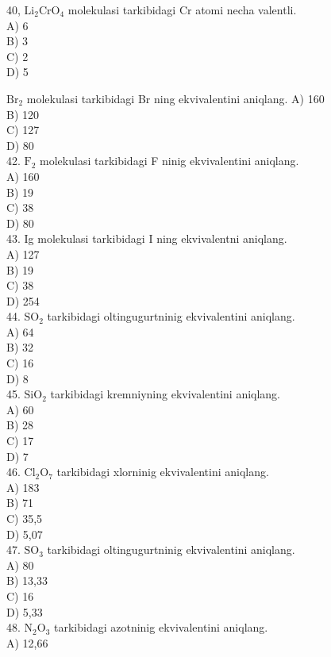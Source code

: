 40, $\mathrm{Li}_{2} \mathrm{CrO}_{4}$ molekulasi tarkibidagi Cr atomi necha valentli.\\
A) 6\\
B) 3\\
C) 2\\
D) 5
  \item $\mathrm{Br}_{2}$ molekulasi tarkibidagi Br ning ekvivalentini aniqlang.
A) 160\\
B) 120\\
C) 127\\
D) 80\\
42. $\mathrm{F}_{2}$ molekulasi tarkibidagi F ninig ekvivalentini aniqlang.\\
A) 160\\
B) 19\\
C) 38\\
D) 80\\
43. Ig molekulasi tarkibidagi I ning ekvivalentni aniqlang.\\
A) 127\\
B) 19\\
C) 38\\
D) 254\\
44. $\mathrm{SO}_{2}$ tarkibidagi oltingugurtninig ekvivalentini aniqlang.\\
A) 64\\
B) 32\\
C) 16\\
D) 8\\
45. $\mathrm{SiO}_{2}$ tarkibidagi kremniyning ekvivalentini aniqlang.\\
A) 60\\
B) 28\\
C) 17\\
D) 7\\
46. $\mathrm{Cl}_{2} \mathrm{O}_{7}$ tarkibidagi xlorninig ekvivalentini aniqlang.\\
A) 183\\
B) 71\\
C) 35,5\\
D) 5,07\\
47. $\mathrm{SO}_{3}$ tarkibidagi oltingugurtninig ekvivalentini aniqlang.\\
A) 80\\
B) 13,33\\
C) 16\\
D) 5,33\\
48. $\mathrm{N}_{2} \mathrm{O}_{3}$ tarkibidagi azotninig ekvivalentini aniqlang.\\
A) 12,66\\
